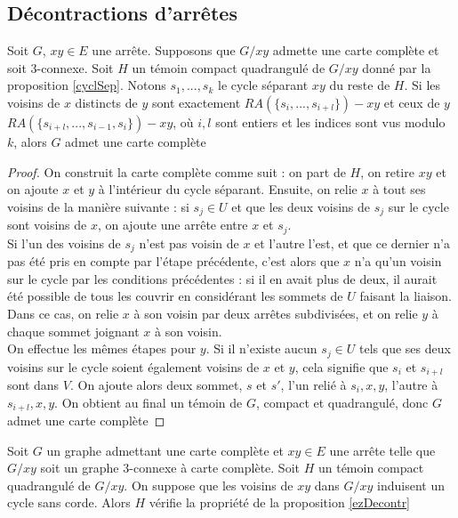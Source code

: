 \documentclass{scrartcl}
\begin{document}
\begin{flushleft}
\subsection{Décontractions d'arrêtes}

\begin{prop}\label{ezDecontr}
    Soit $G$, $xy \in E$ une arrête. Supposons que $G / xy$ admette une carte complète et soit $3$-connexe. Soit $H$ un témoin compact
    quadrangulé de $G / xy$ donné par la proposition \ref{cyclSep}. Notons $s_1, ..., s_k$ le cycle séparant $xy$ du reste de $H$.
    Si les voisins de $x$ distincts de $y$ sont exactement $RA(\{s_i, ..., s_{i+l}\}) - xy$ et ceux de $y$
    $RA(\{s_{i+l}, ..., s_{i-1}, s_i\}) - xy$,
    où $i, l$ sont entiers et les indices sont vus modulo $k$, alors $G$ admet une carte complète
\end{prop}

\begin{proof}
    On construit la carte complète comme suit : on part de $H$, on retire $xy$ et on ajoute $x$ et $y$ à l'intérieur du cycle séparant.
    Ensuite, on relie $x$ à tout ses voisins de la manière suivante : si $s_j \in U$ et que les deux voisins de $s_j$ sur le cycle
    sont voisins de $x$, on ajoute une arrête entre $x$ et $s_j$.\\
    Si l'un des voisins de $s_j$ n'est pas voisin de $x$ et l'autre l'est,
    et que ce dernier n'a pas été pris en compte par l'étape précédente, c'est alors que $x$ n'a qu'un voisin sur le cycle par
    les conditions précédentes : si il en avait plus de deux, il aurait été possible de tous les couvrir en considérant les sommets
    de $U$ faisant la liaison. Dans ce cas, on relie $x$ à son voisin par deux arrêtes subdivisées, et on relie $y$ à chaque sommet
    joignant $x$ à son voisin.\\
    On effectue les mêmes étapes pour $y$. Si il n'existe aucun $s_j \in U$ tels que ses deux voisins sur le cycle soient également
    voisins de $x$ et $y$, cela signifie que $s_i$ et $s_{i+l}$ sont dans $V$. On ajoute alors deux sommet, $s$ et $s'$, l'un relié
    à $s_i, x, y$, l'autre à $s_{i+l}, x, y$. On obtient au final un témoin de $G$, compact et quadrangulé, donc $G$ admet une carte
    complète
\end{proof}

\begin{lem}
    Soit $G$ un graphe admettant une carte complète et $xy \in E$ une arrête telle que $G / xy$ soit un graphe $3$-connexe à
    carte complète. Soit $H$ un témoin compact quadrangulé de $G / xy$. On suppose que les voisins de $xy$ dans $G / xy$
    induisent un cycle sans corde.
    Alors $H$ vérifie la propriété de la proposition \ref{ezDecontr}
\end{lem}


\end{flushleft}
\end{document}
